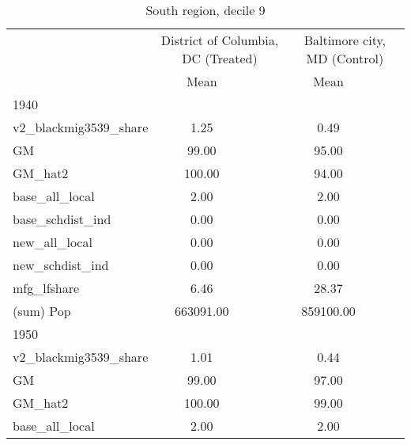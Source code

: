\begin{table}[htbp]\centering
\def\sym#1{\ifmmode^{#1}\else\(^{#1}\)\fi}
\caption{South region, decile 9 \label{tab1}}
\begin{tabular}{l*{2}{ccc}}
\toprule
                    &\multicolumn{3}{c}{District of Columbia, DC (Treated)}&\multicolumn{3}{c}{Baltimore city, MD (Control)}\\
                    &        Mean&            &            &        Mean&            &            \\
\midrule
1940                &            &            &            &            &            &            \\
v2\_blackmig3539\_share&        1.25&            &            &        0.49&            &            \\
GM                  &       99.00&            &            &       95.00&            &            \\
GM\_hat2             &      100.00&            &            &       94.00&            &            \\
base\_all\_local      &        2.00&            &            &        2.00&            &            \\
base\_schdist\_ind    &        0.00&            &            &        0.00&            &            \\
new\_all\_local       &        0.00&            &            &        0.00&            &            \\
new\_schdist\_ind     &        0.00&            &            &        0.00&            &            \\
mfg\_lfshare         &        6.46&            &            &       28.37&            &            \\
(sum) Pop           &   663091.00&            &            &   859100.00&            &            \\
\midrule
1950                &            &            &            &            &            &            \\
v2\_blackmig3539\_share&        1.01&            &            &        0.44&            &            \\
GM                  &       99.00&            &            &       97.00&            &            \\
GM\_hat2             &      100.00&            &            &       99.00&            &            \\
base\_all\_local      &        2.00&            &            &        2.00&            &            \\

\end{tabular}
\end{table}
